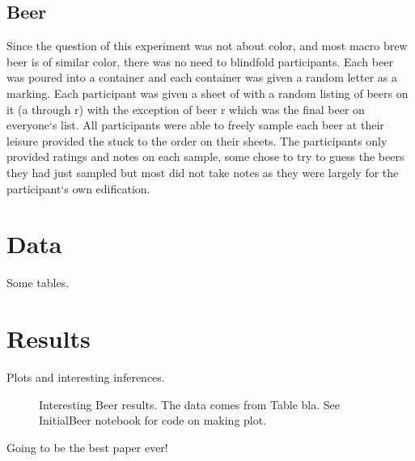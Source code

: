 \documentclass{aastex62}
\begin{document}
\subsection{Beer}
Since the question of this experiment was not about color, and most macro brew beer is of similar color, there was no need to blindfold participants.
Each beer was poured into a container and each container was given a random letter as a marking.
Each participant was given a sheet of with a random listing of beers on it  (a through r) with the exception of beer r which was the final beer on everyone`s list.
All participants were able to freely sample each beer at their leisure provided the stuck to the order on their sheets.
The participants only provided ratings and notes on each sample, some chose to try to guess the beers they had just sampled but most did not take notes as they were largely for the participant`s own edification.


\section{Data} \label{sec:style}
Some tables.


\section{Results} \label{sec:style}
Plots and interesting inferences.
\begin{figure}[ht!]
\caption{Interesting Beer results. The data comes from Table bla. See InitialBeer notebook for code on making plot.}
\end{figure}


\begin{thebibliography}{}
Going to be the best paper ever!

\end{thebibliography}
\end{document}
